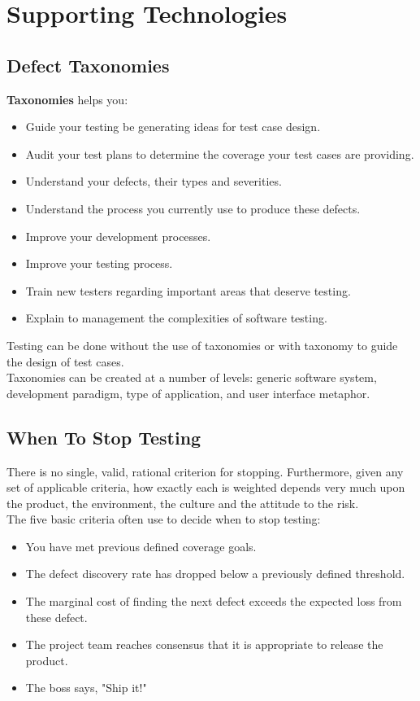\documentclass{article}
\begin{document}
\section*{Supporting Technologies}
\subsection*{Defect Taxonomies}
\textbf{Taxonomies} helps you:
\begin{itemize}
\item Guide your testing be generating ideas for test case design.
\item Audit your test plans to determine the coverage your test cases are providing.
\item Understand your defects, their types and severities.
\item Understand the process you currently use to produce these defects.
\item Improve your development processes.
\item Improve your testing process.
\item Train new testers regarding important areas that deserve testing.
\item Explain to management the complexities of software testing.
\end{itemize}
Testing can be done without the use of taxonomies or with taxonomy to guide the design of test cases.
\\
Taxonomies can be created at a number of levels: generic software system, development paradigm, type of application, and user interface metaphor.

\subsection*{When To Stop Testing}
There is no single, valid, rational criterion for stopping. Furthermore, given any set of applicable criteria, how exactly each is weighted depends very much upon the product, the environment, the culture and the attitude to the risk.
\\
The five basic criteria often use to decide when to stop testing:
\begin{itemize}
\item You have met previous defined coverage goals.
\item The defect discovery rate has dropped below a previously defined threshold.
\item The marginal cost of finding the next defect exceeds the expected loss from these defect.
\item The project team reaches consensus that it is appropriate to release the product.
\item The boss says, "Ship it!"
\end{itemize}
\end{document}
